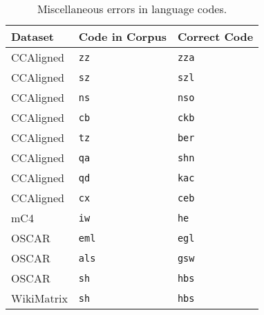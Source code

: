 \begin{table}[!th]
    \small
    \centering
    \begin{tabular}{lll}
        \toprule
        \textbf{Dataset} & \textbf{Code in Corpus} & \textbf{Correct Code} \\
        \midrule
        CCAligned        & \texttt{zz}             & \texttt{zza}          \\
        CCAligned        & \texttt{sz}             & \texttt{szl}          \\
        CCAligned        & \texttt{ns}             & \texttt{nso}          \\
        CCAligned        & \texttt{cb}             & \texttt{ckb}          \\
        CCAligned        & \texttt{tz}             & \texttt{ber}          \\
        CCAligned        & \texttt{qa}             & \texttt{shn}          \\
        CCAligned        & \texttt{qd}             & \texttt{kac}          \\
        CCAligned        & \texttt{cx}             & \texttt{ceb}          \\
        \midrule
        mC4              & \texttt{iw}             & \texttt{he}           \\
        \midrule
        OSCAR            & \texttt{eml}            & \texttt{egl}          \\
        OSCAR            & \texttt{als}            & \texttt{gsw}          \\
        OSCAR            & \texttt{sh}             & \texttt{hbs}          \\
        \midrule
        WikiMatrix       & \texttt{sh}             & \texttt{hbs}          \\
        \bottomrule
    \end{tabular}
    \caption{Miscellaneous errors in language codes.}
    \label{tab:misc_codes}
\end{table}







